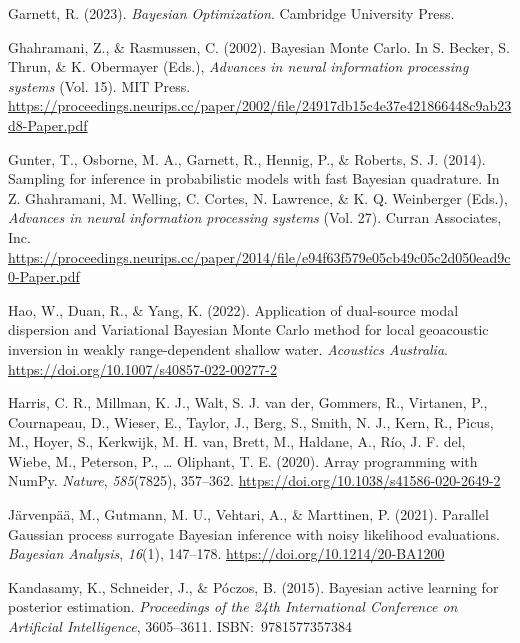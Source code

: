 \documentclass[
]{article}
\newlength{\cslhangindent}
\newlength{\cslentryspacingunit} %
\newenvironment{CSLReferences}[2] %
 {%
  \setlength{\parindent}{0pt}
  \ifodd #1
  \let\oldpar\par
  \def\par{\hangindent=\cslhangindent\oldpar}
  \fi
  \setlength{\parskip}{#2\cslentryspacingunit}
 }%
 {}
\begin{document}
\begin{CSLReferences}{1}{0}
\leavevmode{}%
Garnett, R. (2023). \emph{{Bayesian Optimization}}. Cambridge University
Press.

\leavevmode{}%
Ghahramani, Z., \& Rasmussen, C. (2002). {Bayesian Monte Carlo}. In S.
Becker, S. Thrun, \& K. Obermayer (Eds.), \emph{Advances in neural
information processing systems} (Vol. 15). MIT Press.
\url{https://proceedings.neurips.cc/paper/2002/file/24917db15c4e37e421866448c9ab23d8-Paper.pdf}

\leavevmode{}%
Gunter, T., Osborne, M. A., Garnett, R., Hennig, P., \& Roberts, S. J.
(2014). Sampling for inference in probabilistic models with fast
{Bayesian} quadrature. In Z. Ghahramani, M. Welling, C. Cortes, N.
Lawrence, \& K. Q. Weinberger (Eds.), \emph{Advances in neural
information processing systems} (Vol. 27). Curran Associates, Inc.
\url{https://proceedings.neurips.cc/paper/2014/file/e94f63f579e05cb49c05c2d050ead9c0-Paper.pdf}

\leavevmode{}%
Hao, W., Duan, R., \& Yang, K. (2022). Application of dual-source modal
dispersion and {Variational Bayesian Monte Carlo} method for local
geoacoustic inversion in weakly range-dependent shallow water.
\emph{Acoustics Australia}.
\url{https://doi.org/10.1007/s40857-022-00277-2}

\leavevmode{}%
Harris, C. R., Millman, K. J., Walt, S. J. van der, Gommers, R.,
Virtanen, P., Cournapeau, D., Wieser, E., Taylor, J., Berg, S., Smith,
N. J., Kern, R., Picus, M., Hoyer, S., Kerkwijk, M. H. van, Brett, M.,
Haldane, A., Río, J. F. del, Wiebe, M., Peterson, P., \ldots{} Oliphant,
T. E. (2020). Array programming with NumPy. \emph{Nature},
\emph{585}(7825), 357--362.
\url{https://doi.org/10.1038/s41586-020-2649-2}

\leavevmode{}%
Järvenpää, M., Gutmann, M. U., Vehtari, A., \& Marttinen, P. (2021).
Parallel {Gaussian} process surrogate {Bayesian} inference with noisy
likelihood evaluations. \emph{Bayesian Analysis}, \emph{16}(1),
147--178. \url{https://doi.org/10.1214/20-BA1200}

\leavevmode{}%
Kandasamy, K., Schneider, J., \& Póczos, B. (2015). {Bayesian} active
learning for posterior estimation. \emph{Proceedings of the 24th
International Conference on Artificial Intelligence}, 3605--3611.
ISBN:~9781577357384


\end{CSLReferences}
\end{document}
